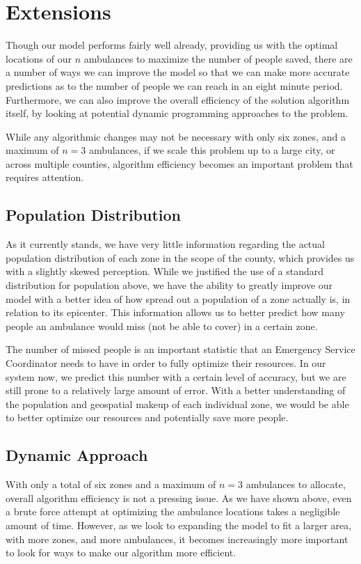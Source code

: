 \documentclass[notitlepage, 12pt]{article}
\begin{document}
\section{Extensions}
Though our model performs fairly well already, providing us with the optimal locations of our $n$ ambulances to
maximize the number of people saved, there are a number of ways we can improve the model so that we can make more
accurate predictions as to the number of people we can reach in an eight minute period. Furthermore, we can also
improve the overall efficiency of the solution algorithm itself, by looking at potential dynamic programming approaches to the problem.

While any algorithmic changes may not be necessary with only six zones, and a maximum of $n = 3$ ambulances, if
we scale this problem up to a large city, or across multiple counties, algorithm efficiency becomes an important problem that requires attention.

\subsection{Population Distribution}
As it currently stands, we have very little information regarding the actual population distribution of each
zone in the scope of the county, which provides us with a slightly skewed perception. While we justified the
use of a standard distribution for population above, we have the ability to greatly improve our model with a
better idea of how spread out a population of a zone actually is, in relation to its epicenter. This information
allows us to better predict how many people an ambulance would miss (not be able to cover) in a certain zone.

The number of missed people is an important statistic that an Emergency Service Coordinator needs to have in
order to fully optimize their resources. In our system now, we predict this number with a certain level of accuracy,
but we are still prone to a relatively large amount of error. With a better understanding of the population and
geospatial makeup of each individual zone, we would be able to better optimize our resources and potentially save more people.

\subsection{Dynamic Approach}
With only a total of six zones and a maximum of $n = 3$ ambulances to allocate, overall algorithm efficiency is
not a pressing issue. As we have shown above, even a brute force attempt at optimizing the ambulance locations
takes a negligible amount of time. However, as we look to expanding the model to fit a larger area, with more
zones, and more ambulances, it becomes increasingly more important to look for ways to make our algorithm more efficient.
\end{document}
